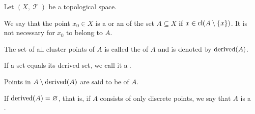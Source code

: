 \begin{definition}\label{def:topological_derived_set}\mcite\cite[24]{Engelking1989}
  Let \( (X, \mscrT) \) be a topological space.

  \begin{thmenum}
     We say that the point \( x_0 \in X \) is a  or an  of the set \( A \subseteq X \) if \( x \in \operatorname{cl}(A \setminus \{ x \}) \). It is not necessary for \( x_0 \) to belong to \( A \).

     The set of all cluster points of \( A \) is called the  of \( A \) and is denoted by \( \operatorname{derived}(A) \).

     If a set equals its derived set, we call it a .

     Points in \( A \setminus \operatorname{derived}(A) \) are said to be  of \( A \).

     If \( \operatorname{derived}(A) = \varnothing \), that is, if \( A \) consists of only discrete points, we say that \( A \) is a .
  \end{thmenum}
\end{definition}

